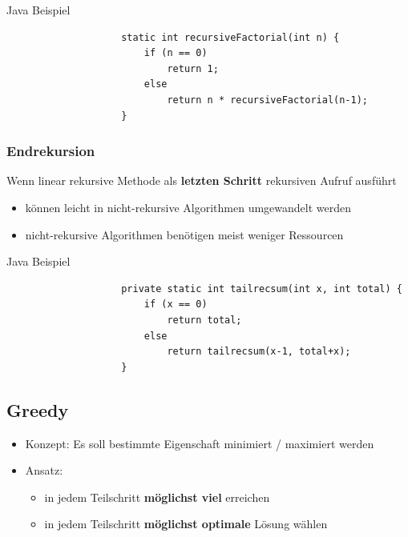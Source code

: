\documentclass[a4paper, landscape, 8pt]{scrartcl}
\begin{document}
\begin{multicols*}{4}
                    \textcolor{subsectioncolor}{Java Beispiel}
                    \begin{lstlisting}
                    static int recursiveFactorial(int n) {
                        if (n == 0)
                            return 1;
                        else
                            return n * recursiveFactorial(n-1);
                    }
                    \end{lstlisting}

                \subsubsection{Endrekursion}
                    Wenn linear rekursive Methode als {\bfseries letzten Schritt} rekursiven Aufruf ausführt
                    \begin{itemize}
                        \item können leicht in nicht-rekursive Algorithmen umgewandelt werden
                        \item nicht-rekursive Algorithmen benötigen meist weniger Ressourcen
                    \end{itemize}
                    \newline
                    \textcolor{subsectioncolor}{Java Beispiel}
                    \begin{lstlisting}
                    private static int tailrecsum(int x, int total) {
                        if (x == 0)
                            return total;
                        else
                            return tailrecsum(x-1, total+x);
                    }
                    \end{lstlisting}

            \subsection{Greedy}
                \begin{itemize}
                    \item Konzept: Es soll bestimmte Eigenschaft minimiert / maximiert werden
                    \item Ansatz:
                    \begin{itemize}
                        \item in jedem Teilschritt {\bfseries möglichst viel} erreichen
                        \item in jedem Teilschritt {\bfseries möglichst optimale} Lösung wählen
                    \end{itemize}
                \end{itemize}

\end{multicols*}
\end{document}

